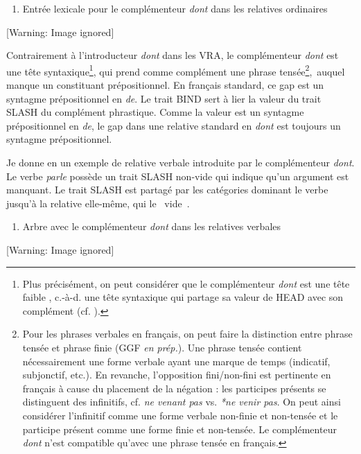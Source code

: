 \begin{enumerate}
\item \label{bkm:Ref299110275}Entrée lexicale pour le complémenteur \textit{dont} dans les relatives ordinaires


\end{enumerate}
  [Warning: Image ignored] %
 

Contrairement à l'introducteur \textit{dont} dans les VRA, le complémenteur \textit{dont} est une tête syntaxique\footnote{Plus précisément, on peut considérer que le complémenteur \textit{dont} est une tête {\guillemotleft} faible {\guillemotright}, c.-à-d. une tête syntaxique qui partage sa valeur de HEAD avec son complément (cf. \citet{Tseng2002}).}, qui prend comme complément une phrase tensée\footnote{Pour les phrases verbales en français, on peut faire la distinction entre phrase tensée et phrase finie (GGF \textit{en prép.}). Une phrase tensée contient nécessairement une forme verbale ayant une marque de temps (indicatif, subjonctif, etc.). En revanche, l'opposition fini/non-fini est pertinente en français à cause du placement de la négation : les participes présents se distinguent des infinitifs, cf. \textit{ne venant pas} vs. \textit{*ne venir pas}. On peut ainsi considérer l'infinitif comme une forme verbale non-finie et non-tensée et le participe présent comme une forme finie et non-tensée. Le complémenteur \textit{dont} n'est compatible qu'avec une phrase tensée en français.},~auquel manque un constituant prépositionnel. En français standard, ce gap est un syntagme prépositionnel en \textit{de}. Le trait BIND sert à lier la valeur du trait SLASH du complément phrastique. Comme la valeur est un syntagme prépositionnel en \textit{de}, le gap dans une relative standard en \textit{dont} est toujours un syntagme prépositionnel.

Je donne en  un exemple de relative verbale introduite par le complémenteur \textit{dont}.  Le verbe \textit{parle} possède un trait SLASH non-vide qui indique qu'un argument est manquant. Le trait SLASH est partagé par les catégories dominant le verbe jusqu'à la relative elle-même, qui le {\guillemotleft}~vide~{\guillemotright}. 


\begin{enumerate}
\item \label{bkm:Ref299039682}Arbre avec le complémenteur \textit{dont} dans les relatives verbales


\end{enumerate}
{   [Warning: Image ignored] %
} 

